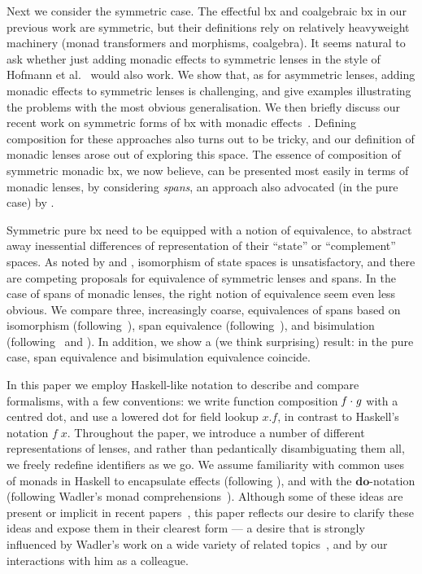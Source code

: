 \documentclass[runningheads]{llncs}
\newcommand{\Varid}[1]{\mathit{#1}}
\begin{document}
Next we consider the symmetric case. The effectful bx and coalgebraic
bx in our previous work are symmetric, but their definitions rely on
relatively heavyweight machinery (monad transformers and morphisms,
coalgebra).  It seems natural to ask whether just adding monadic
effects to symmetric lenses in the style of Hofmann et al.~\citep{symlens} would also
work.  We show that, as for asymmetric lenses, adding monadic effects 
to symmetric lenses is challenging, and give examples illustrating
the problems with the most obvious generalisation.
We then briefly discuss our recent work on symmetric forms of bx with
monadic effects~\citep{cheney14bx2,abousaleh15mpc,abousaleh15bx}.
Defining composition for these approaches also turns out to be tricky,
and our definition of monadic lenses arose out of exploring this
space.  The essence of composition of symmetric monadic bx, we now
believe, can be presented most easily in terms of monadic lenses, by
considering \emph{spans}, an approach also advocated (in the pure
case) by \citet{johnson14bx}.

Symmetric pure bx need to be equipped with a notion of equivalence, to
abstract away inessential differences of representation of their
``state'' or ``complement'' spaces.  As noted by \citet{symlens} and \citet{johnson14bx},
isomorphism of state spaces is unsatisfactory, and there are competing
proposals for equivalence of symmetric lenses and spans.  In the case
of spans of monadic lenses, the right notion of equivalence seem even
less obvious.  We compare three, increasingly coarse, equivalences
of spans based on isomorphism (following~\citet{abousaleh15mpc}), span
equivalence (following~\citet{johnson14bx}), and bisimulation
(following~\citet{symlens} and \citet{abousaleh15bx}).  In addition, we show a (we
think surprising) result: in the pure case, span equivalence and
bisimulation equivalence coincide.


In this paper we employ Haskell-like notation to describe and compare
formalisms, with a few conventions: we write function composition \ensuremath{\Varid{f}\hsdot{\mathbin{\cdot}}{\mathrel{.}}\Varid{g}} with a centred dot, and use a lowered dot for field lookup
\ensuremath{\Varid{x}\mathord{.}\Varid{f}}, in contrast to Haskell's notation \ensuremath{\Varid{f}\;\Varid{x}}.  Throughout the
paper, we introduce a number of different representations of lenses,
and rather than pedantically disambiguating them all, we freely
redefine identifiers as we go.  We assume familiarity with common uses
of monads in Haskell to encapsulate
effects (following \citet{DBLP:conf/afp/Wadler95}), and with the
\ensuremath{\mathbf{do}}-notation (following Wadler's
monad comprehensions~\citet{DBLP:journals/mscs/Wadler92}).
Although some of these ideas are present or implicit in recent
papers~\citep{symlens,johnson14bx,cheney14bx2,abousaleh15mpc,abousaleh15bx},
this paper reflects our desire to clarify these ideas and expose them
in their clearest form --- a desire that is strongly influenced by
Wadler's work on a wide variety of related
topics~\citep{DBLP:journals/mscs/Wadler92,DBLP:conf/fp/KingW92,DBLP:conf/afp/Wadler95},
and by our interactions with him as a colleague.
\end{document}
